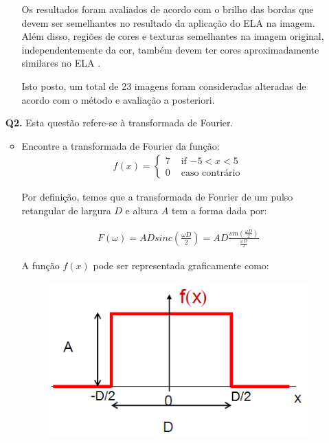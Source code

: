 \documentclass[12pt]{article}
\begin{document}
\begin{itemize}
\begin{itemize}
Os resultados foram avaliados de acordo com o brilho das bordas que devem ser semelhantes no resultado 
da aplicação do ELA na imagem. Além disso, regiões de cores e texturas semelhantes na imagem
original, independentemente da cor, também devem ter cores aproximadamente similares no ELA \cite{berkeleywebsite}.

Isto posto, um total de 23 imagens foram consideradas alteradas de acordo com o método e avaliação a posteriori.
\end{itemize}
%
%
%
\item[{\bf Q2.}] Esta questão refere-se à transformada de Fourier.
\begin{itemize}
\item Encontre a transformada de Fourier da função:
\begin{eqnarray*}
f(x) = \left\{ \begin{array}{rl} 
 7 &\mbox{ if $-5 < x < 5$} \\
 0 &\mbox{ caso contrário}
       \end{array} \right.
\end{eqnarray*}

Por definição, temos que a transformada de Fourier de um pulso
retangular de largura $D$ e altura $A$ tem a forma dada por:

\begin{eqnarray*}
    F(\omega) = ADsinc(\frac{\omega D}{2})  = AD\frac{sin(\frac{\omega D}{2})}{\frac{\omega D}{2}}
\end{eqnarray*}

A função $f(x)$ pode ser representada graficamente como:
\begin{figure}[htb]
\centering   
\begin{minipage}[b]{0.45\textwidth}
	\centering
        \includegraphics[scale=0.3]{Q3Images/pulse_function.png} 
\end{minipage}
\end{figure}


\end{itemize}
\end{itemize}
\end{document}
